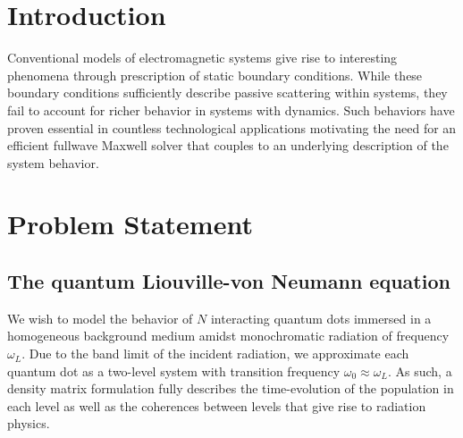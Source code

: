 \documentclass[conference]{IEEEtran}
\begin{document}
\IEEEpeerreviewmaketitle

\section{Introduction}
Conventional models of electromagnetic systems give rise to interesting phenomena through prescription of static boundary conditions.
While these boundary conditions sufficiently describe passive scattering within systems, they fail to account for richer behavior in systems with dynamics.
Such behaviors have proven essential in countless technological applications motivating the need for an efficient fullwave Maxwell solver that couples to an underlying description of the system behavior.

\section{Problem Statement}

\subsection{The quantum Liouville-von Neumann equation}
We wish to model the behavior of $N$ interacting quantum dots immersed in a homogeneous background medium amidst monochromatic radiation of frequency $\omega_L$. Due to the band limit of the incident radiation, we approximate each quantum dot as a two-level system with transition frequency $\omega_0 \approx \omega_L$.
As such, a density matrix formulation fully describes the time-evolution of the population in each level as well as the coherences between levels that give rise to radiation physics.
\end{document}
